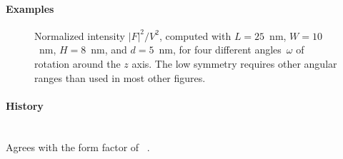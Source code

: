 \paragraph{Examples}\strut

\begin{figure}[H]
\begin{center}
\end{center}
\caption{Normalized intensity $|F|^2/V^2$,
computed with $L=25$~nm, $W=10$~nm, $H=8$~nm, and $d=5$~nm,
for four different angles~$\omega$ of rotation around the $z$ axis.
The low symmetry requires other angular ranges than used in most other figures.}
\end{figure}

\paragraph{History}\strut\\
Agrees with the  form factor of \FitGISAXS\ \cite{Bab13}.

